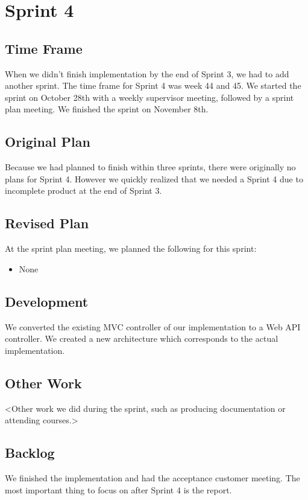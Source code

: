 \section{Sprint 4}

\subsection{Time Frame}
When we didn't finish implementation by the end of Sprint 3, we had to add another sprint. The time frame for Sprint 4 was week 44 and 45. We started the sprint on October 28th with a weekly supervisor meeting, followed by a sprint plan meeting. We finished the sprint on November 8th.

\subsection{Original Plan}
Because we had planned to finish within three sprints, there were originally no plans for Sprint 4. However we quickly realized that we needed a Sprint 4 due to incomplete product at the end of Sprint 3.

\subsection{Revised Plan}
At the sprint plan meeting, we planned the following for this sprint:
\begin{itemize}
	\item None
\end{itemize}


\subsection{Development}
We converted the existing MVC controller of our implementation to a Web API controller.
We created a new architecture which corresponds to the actual implementation.

\subsection{Other Work}
<Other work we did during the sprint, such as producing documentation or attending courses.>

\subsection{Backlog}
We finished the implementation and had the acceptance customer meeting.
The most important thing to focus on after Sprint 4 is the report.


